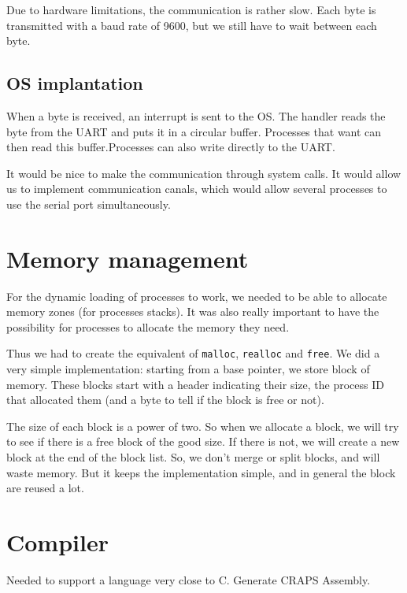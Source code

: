 \documentclass[openany, a4paper]{book}
\begin{document}
      Due to hardware limitations, the communication is rather slow. Each byte
      is transmitted with a baud rate of 9600, but we still have to wait
      between each byte.

      \subsection{OS implantation}

         When a byte is received, an interrupt is sent to the OS. The handler
         reads the byte from the UART and puts it in a circular buffer.
         Processes that want can then read this buffer.Processes can also write
         directly to the UART.

        It would be nice to make the communication through system calls. It
        would allow us to implement communication canals, which would allow
        several processes to use the serial port simultaneously. 



    \section{Memory management}
      For the dynamic loading of processes to work, we needed to be able to
      allocate memory zones (for processes stacks). It was also really important
      to have the possibility for processes to allocate the memory they need.

      Thus we had to create the equivalent of \verb+malloc+, \verb+realloc+ and
      \verb+free+. We did a very
      simple implementation: starting from a base pointer, we store block of
      memory. These blocks start with a header indicating their size, the
      process ID that allocated them (and a byte to tell if the block is free or
      not).

      The size of each block is a power of two. So when we allocate a block, we
      will try to see if there is a free block of the good size. If there is
      not, we will create a new block at the end of the block list.
      So, we don't merge or split blocks, and will waste memory. But it keeps
      the implementation simple, and in general the block are reused a lot.

    \section{Compiler}
      Needed to support a language very close to C. Generate CRAPS Assembly.
\end{document}
